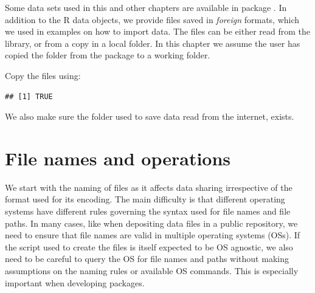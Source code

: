 \documentclass[krantz2]{krantz}\usepackage{knitr}
\begin{document}
\begin{infobox}
Some data sets used in this and other chapters are available in package . In addition to the
R data objects, we provide files saved in \emph{foreign} formats, which we used in examples on how to import data. The files can be either read from the \Rlang library, or from a copy in a local folder. In this chapter we assume the user has copied the folder  from the package to a working folder.

Copy the files using:

\begin{knitrout}\footnotesize
{}\color{fgcolor}\begin{kframe}
\begin{alltt}
 \hlkwb{<-} \hlstd{(}\hlstd{,}  \hlstd{=} \hlstd{)}
 \hlstd{,}  \hlstd{=} \hlstd{,}  \hlstd{=} \hlstd{)}
\end{alltt}
\begin{verbatim}
## [1] TRUE
\end{verbatim}
\end{kframe}
\end{knitrout}

We also make sure the folder used to save data read from the internet, exists.

\begin{knitrout}\footnotesize
{}\color{fgcolor}\begin{kframe}
\begin{alltt}
 \hlkwb{=} 
 \hlstd{(}\hlopt{!}
\hlstd{\}}
\end{alltt}
\end{kframe}
\end{knitrout}
\end{infobox}

\section{File names and operations}\label{sec:files:filenames}
We start with the naming of files as it affects data sharing irrespective of the format used for its encoding. The main difficulty is that different operating systems have different rules governing the syntax used for file names and file paths. In many cases, like when depositing data files in a public repository, we need to ensure that file names are valid in multiple operating systems (OSs). If the script used to create the files is itself expected to be OS agnostic, we also need to be careful to query the OS for file names and paths without making assumptions on the naming rules or available OS commands. This is especially important when developing \Rlang packages.
\end{document}

